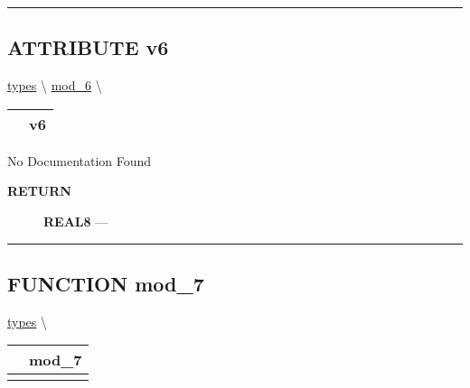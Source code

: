 \rule{\linewidth}{0.5pt}

\subsection*{\textsf{\colorbox{headtoc}{\color{white} ATTRIBUTE}
v6}}

\hypertarget{ecldoc:types.mod_5.v6}{}
\hspace{0pt} \hyperlink{ecldoc:types}{types} \textbackslash 
\hspace{0pt} \hyperlink{ecldoc:types.mod_6}{mod_6} \textbackslash 

{\renewcommand{\arraystretch}{1.5}
\begin{tabularx}{\textwidth}{|>{\raggedright\arraybackslash}l|X|}
\hline
\hspace{0pt}\mytexttt{\color{red} } & \textbf{v6} \\
\hline
\end{tabularx}
}

\par





No Documentation Found








\par
\begin{description}
\item [\colorbox{tagtype}{\color{white} \textbf{\textsf{RETURN}}}] \textbf{REAL8} --- 
\end{description}




\rule{\linewidth}{0.5pt}


\subsection*{\textsf{\colorbox{headtoc}{\color{white} FUNCTION}
mod\_7}}

\hypertarget{ecldoc:types.mod_7}{}
\hspace{0pt} \hyperlink{ecldoc:types}{types} \textbackslash 

{\renewcommand{\arraystretch}{1.5}
\begin{tabularx}{\textwidth}{|>{\raggedright\arraybackslash}l|X|}
\hline
\hspace{0pt}\mytexttt{\color{red} } & \textbf{mod\_7} \\
\hline
\multicolumn{2}{|>{\raggedright\arraybackslash}X|}{\hspace{0pt}\mytexttt{\color{param} (mod\_5 y, REAL8 z)}} \\
\hline
\end{tabularx}
}

